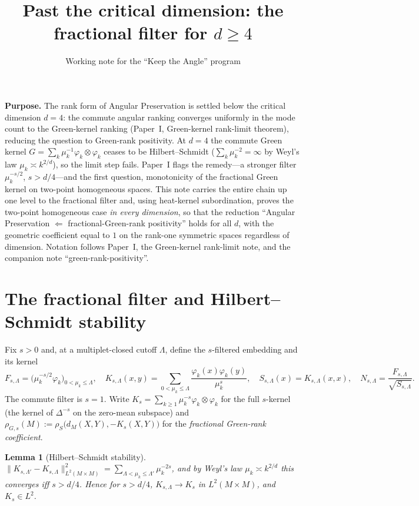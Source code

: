 \documentclass[11pt]{article}
\title{Past the critical dimension: the fractional filter for $d\ge4$}
\author{Working note for the ``Keep the Angle'' program}
\date{}
\newtheorem{lemma}[theorem]{Lemma}
\theoremstyle{remark}
\newcommand{\dM}{d_M}
\begin{document}
\maketitle

\noindent\textbf{Purpose.} The rank form of Angular Preservation is settled below the
critical dimension $d=4$: the commute angular ranking converges uniformly in the mode
count to the Green-kernel ranking (Paper~I, Green-kernel rank-limit theorem), reducing the
question to Green-rank positivity. At $d=4$ the commute Green kernel
$G=\sum_k\mu_k^{-1}\varphi_k\otimes\varphi_k$ ceases to be Hilbert--Schmidt
($\sum_k\mu_k^{-2}=\infty$ by Weyl's law $\mu_k\asymp k^{2/d}$), so the limit step fails.
Paper~I flags the remedy---a stronger filter $\mu_k^{-s/2}$, $s>d/4$---and the first
question, monotonicity of the fractional Green kernel on two-point homogeneous spaces. This
note carries the entire chain up one level to the fractional filter and, using
heat-kernel subordination, proves the two-point homogeneous case \emph{in every dimension},
so that the reduction ``Angular Preservation $\Leftarrow$ fractional-Green-rank positivity''
holds for all $d$, with the geometric coefficient equal to $1$ on the rank-one symmetric
spaces regardless of dimension. Notation follows Paper~I, the Green-kernel rank-limit note,
and the companion note ``green-rank-positivity''.

\section{The fractional filter and Hilbert--Schmidt stability}

Fix $s>0$ and, at a multiplet-closed cutoff $\Lambda$, define the $s$-filtered embedding and
its kernel
\[
F_{s,\Lambda}=\bigl(\mu_k^{-s/2}\varphi_k\bigr)_{0<\mu_k\le\Lambda},\quad
K_{s,\Lambda}(x,y)=\!\!\sum_{0<\mu_k\le\Lambda}\!\!\frac{\varphi_k(x)\varphi_k(y)}{\mu_k^{s}},\quad
S_{s,\Lambda}(x)=K_{s,\Lambda}(x,x),\quad
N_{s,\Lambda}=\frac{F_{s,\Lambda}}{\sqrt{S_{s,\Lambda}}} .
\]
The commute filter is $s=1$. Write $K_s=\sum_{k\ge1}\mu_k^{-s}\varphi_k\otimes\varphi_k$ for
the full $s$-kernel (the kernel of $\Delta^{-s}$ on the zero-mean subspace) and
$\rho_{G,s}(M):=\rho_S\bigl(\dM(X,Y),-K_s(X,Y)\bigr)$ for the \emph{fractional Green-rank
coefficient}.

\begin{lemma}[Hilbert--Schmidt stability]\label{lem:hs}
$\lVert K_{s,\Lambda'}-K_{s,\Lambda}\rVert_{L^2(M\times M)}^2=\sum_{\Lambda<\mu_k\le\Lambda'}\mu_k^{-2s}$,
and by Weyl's law $\mu_k\asymp k^{2/d}$ this converges iff $s>d/4$. Hence for $s>d/4$,
$K_{s,\Lambda}\to K_s$ in $L^2(M\times M)$, and $K_s\in L^2$.
\end{lemma}
\end{document}
